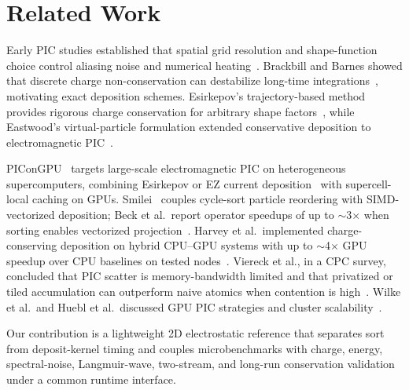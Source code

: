 \section{Related Work}
Early PIC studies established that spatial grid resolution and shape-function choice control aliasing noise and numerical heating~\cite{langdon1970,okuda1972}.
Brackbill and Barnes showed that discrete charge non-conservation can destabilize long-time integrations~\cite{brackbill1980}, motivating exact deposition schemes.
Esirkepov's trajectory-based method provides rigorous charge conservation for arbitrary shape factors~\cite{esirkepov2001}, while Eastwood's virtual-particle formulation extended conservative deposition to electromagnetic PIC~\cite{eastwood1981}.

PIConGPU~\cite{burau2010,huebl2019} targets large-scale electromagnetic PIC on heterogeneous supercomputers, combining Esirkepov or EZ current deposition~\cite{steiniger2023} with supercell-local caching on GPUs.
Smilei~\cite{derouillat2018} couples cycle-sort particle reordering with SIMD-vectorized deposition; Beck et al.\ report operator speedups of up to $\sim$3$\times$ when sorting enables vectorized projection~\cite{beck2019}.
Harvey et al.\ implemented charge-conserving deposition on hybrid CPU--GPU systems with up to $\sim$4$\times$ GPU speedup over CPU baselines on tested nodes~\cite{harvey2015}.
Viereck et al., in a CPC survey, concluded that PIC scatter is memory-bandwidth limited and that privatized or tiled accumulation can outperform naive atomics when contention is high~\cite{viereck2016}.
Wilke et al.\ and Huebl et al.\ discussed GPU PIC strategies and cluster scalability~\cite{wilke2017,huebl2014}.

Our contribution is a lightweight 2D electrostatic reference that separates sort from deposit-kernel timing and couples microbenchmarks with charge, energy, spectral-noise, Langmuir-wave, two-stream, and long-run conservation validation under a common runtime interface.
